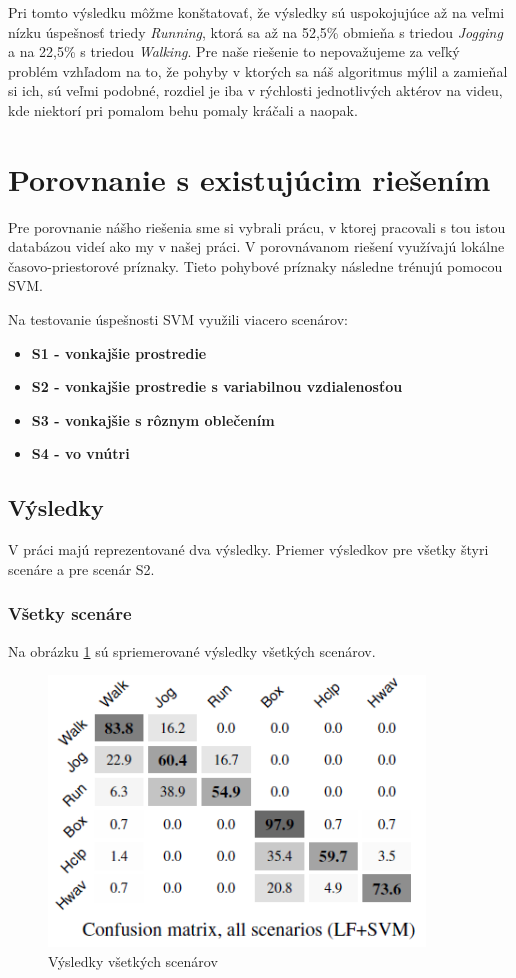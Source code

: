Pri tomto výsledku môžme konštatovať, že výsledky sú uspokojujúce až na veľmi nízku úspešnosť triedy \textit{Running}, ktorá sa až na 52,5\% obmieňa s triedou \textit{Jogging} a na 22,5\% s triedou \textit{Walking}. Pre naše riešenie to nepovažujeme za veľký problém vzhľadom na to, že pohyby v ktorých sa náš algoritmus mýlil a zamieňal si ich, sú veľmi podobné, rozdiel je iba v rýchlosti jednotlivých aktérov na videu, kde niektorí pri pomalom behu pomaly kráčali a naopak. 




\section{Porovnanie s existujúcim riešením}
Pre porovnanie nášho riešenia sme si vybrali prácu, v ktorej pracovali s tou istou databázou videí ako my v našej práci. V porovnávanom riešení využívajú lokálne časovo-priestorové príznaky. Tieto pohybové príznaky následne trénujú pomocou SVM. 

Na testovanie úspešnosti SVM využili viacero scenárov:

\begin{itemize}
\item \textbf{S1 - vonkajšie prostredie}
\item \textbf{S2 - vonkajšie prostredie s variabilnou vzdialenosťou}
\item \textbf{S3 - vonkajšie s rôznym oblečením}
\item \textbf{S4 - vo vnútri}
\end{itemize}

\subsection{Výsledky}
V práci majú reprezentované dva výsledky. Priemer výsledkov pre všetky štyri scenáre a pre scenár S2.

\subsubsection{Všetky scenáre}

Na obrázku \ref{cmp1} sú spriemerované výsledky všetkých scenárov. 
\begin{figure}[H]
  \centering
  \includegraphics[width=10cm]{img/cmpLFSVM.png}
  \caption{Výsledky všetkých scenárov}
  \label{cmp1}
\end{figure}  


